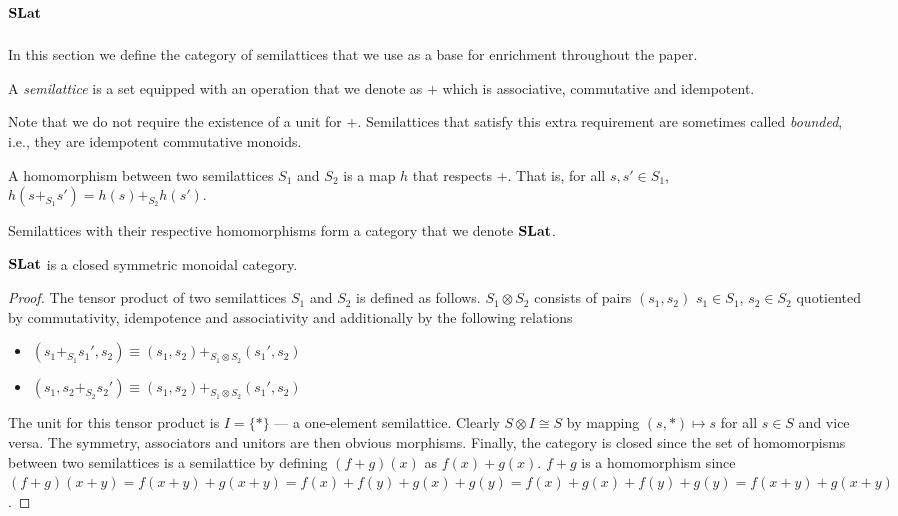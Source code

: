 \section{$\mathbf{SLat}$}
\label{sec:appendix:slat}

In this section we define the category of semilattices that we use as a base for enrichment throughout the paper.

\begin{definition}[Semilattice]
    A \textit{semilattice} is a set equipped with an operation that we denote as $+$ which is associative, commutative and idempotent.
  \end{definition}
  
  Note that we do not require the existence of a unit for $+$. 
  Semilattices that satisfy this extra requirement are sometimes called \textit{bounded}, i.e., they are idempotent commutative monoids.
  
  \begin{definition}
  
  A homomorphism between two semilattices $S_{1}$ and $S_{2}$ is a map $h$ that respects $+$.
  That is, for all $s,s' \in S_{1}$, $h(s +_{S_{1}} s') = h(s) +_{S_{2}} h(s')$.
  \end{definition}
  
  \begin{definition}
    
  Semilattices with their respective homomorphisms form a category that we denote $\mathbf{SLat}$.
  \end{definition}
  
  \begin{proposition}
    $\mathbf{SLat}$ is a closed symmetric monoidal category.
  \end{proposition}
  \begin{proof}
    The tensor product of two semilattices $S_{1}$ and $S_{2}$ is defined as follows.
    $S_{1} \otimes S_{2}$ consists of pairs $(s_1,s_2)$ $s_{1} \in S_{1}$, $s_{2} \in S_{2}$ quotiented by commutativity, idempotence and associativity and additionally by the following relations
    \begin{itemize}
      \item $(s_{1} +_{S_{1}} s_{1}',s_{2}) \equiv (s_{1},s_{2}) +_{S_{1} \otimes S_{2}} (s_{1}',s_{2})$
      \item $(s_{1}, s_{2} +_{S_{2}} s_{2}') \equiv (s_{1},s_{2}) +_{S_{1} \otimes S_{2}} (s_{1}',s_{2})$
    \end{itemize}
  
    The unit for this tensor product is $I = \{*\}$ --- a one-element semilattice.
    Clearly $S \otimes I \cong S$ by mapping $(s,*) \mapsto s$ for all $s \in S$ and vice versa.
    The symmetry, associators and unitors are then obvious morphisms.
    Finally, the category is closed since the set of homomorpisms between two semilattices is a semilattice by defining $(f + g)(x)$ as $f(x) + g(x)$.
    $f + g$ is a homomorphism since $(f + g)(x+y) = f(x+y) + g(x+y) = f(x) + f(y) + g(x) + g(y) = f(x) + g(x) + f(y) + g(y) = f(x+y) + g(x+y)$.
  \end{proof}
  
